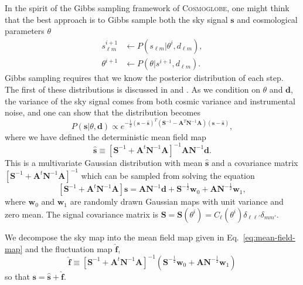 \documentclass[twocolumn]{../common/aa}
\newcommand{\cosmoglobe}{\textsc{Cosmoglobe}}
\begin{document}
In the spirit of the Gibbs sampling framework of \cosmoglobe, one might think that the best approach is to Gibbs sample both the sky signal $\mathbf{s}$ and cosmological parameters $\theta$
\begin{align}
    s_{\ell m}^{i+1} &\leftarrow P(s_{\ell m} | \theta^{i}, d_{\ell m}),\\
    \label{eq:theta-gibbs}
    \theta^{i+1} &\leftarrow P(\theta | s^{i+1}, d_{\ell m}).
\end{align}
Gibbs sampling requires that we know the posterior distribution of each step. The first of these distributions is discussed in \cite{jewell2004} and \cite{wandelt2004}. As we condition on $\theta$ and $\textbf{d}$, the variance of the sky signal comes from both cosmic variance and instrumental noise, and one can show that the distribution becomes
\begin{equation}
    P(\mathbf{s} | \theta, \mathbf{d}) \propto e^{-\frac12 \left(\mathbf{s} - \hat{\mathbf{s}}\right)^T \left(\mathbf{S}^{-1} - \mathbf{A}^T\mathbf{N}^{-1}\mathbf{A}\right) \left(\mathbf{s} - \hat{\mathbf{s}}\right)},
\end{equation}
where we have defined the deterministic mean field map
\begin{equation}
\label{eq:mean-field-map}
\hat{\textbf{s}} \equiv \left[\mathbf{S}^{-1} + \mathbf{A}^t \mathbf{N}^{-1}\mathbf{A} \right]^{-1} \mathbf{A} \mathbf{N}^{-1} \mathbf{d}.
\end{equation}
This is a multivariate Gaussian distribution with mean $\hat{\textbf{s}}$ and a covariance matrix $\left[\mathbf{S}^{-1} + \mathbf{A}^t \mathbf{N}^{-1}\mathbf{A} \right]^{-1}$ which can be sampled from solving the equation
\begin{equation}
    \label{eq:mapmakingeq}
    \left[\mathbf{S}^{-1} + \mathbf{A}^t \mathbf{N}^{-1}\mathbf{A} \right]\mathbf{s} = \mathbf{A} \mathbf{N}^{-1} \mathbf{d} + \mathbf{S}^{-\frac{1}{2}}\mathbf{w}_0 +\mathbf{A N}^{-\frac{1}{2}}\mathbf{w}_1,
\end{equation}
where $\mathbf{w}_0$ and $\mathbf{w}_1$ are randomly drawn Gaussian maps with unit variance and zero mean. The signal covariance matrix is $\mathbf{S} = \mathbf{S}(\theta^i) = C_{\ell}\left(\theta^i\right)\delta_{\ell \ell'}\delta_{mm'}$.

We decompose the sky map into the mean field map given in Eq.~\eqref{eq:mean-field-map} and the fluctuation map $\hat{\textbf{f}}$,
\begin{equation}
\label{eq:fluc-map}
\hat{\textbf{f}} \equiv \left[\mathbf{S}^{-1} + \mathbf{A}^t \mathbf{N}^{-1}\mathbf{A} \right]^{-1} \left(\mathbf{S}^{-\frac{1}{2}}\mathbf{w}_0 +\mathbf{A N}^{-\frac{1}{2}}\mathbf{w}_1 \right)
\end{equation}
so that $\mathbf{s} = \hat{\mathbf{s}} + \hat{\mathbf{f}}$.
\end{document}
